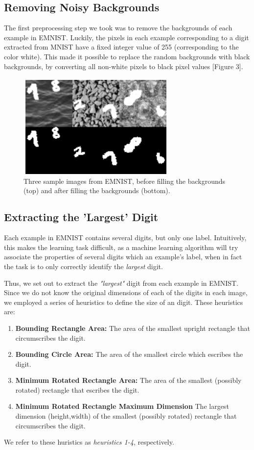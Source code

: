 \documentclass[letterpaper, 10 pt, conference]{ieeeconf}  %
\begin{document}
\subsection{Removing Noisy Backgrounds} 

The first preprocessing step we took was to remove the backgrounds of each example in EMNIST. Luckily, the pixels in each example corresponding to a digit extracted from MNIST have a fixed integer value of 255 (corresponding to the color white). This made it possible to replace the random backgrounds with black backgrounds, by converting all non-white pixels to black pixel values [Figure 3].
\begin{figure}[H]
      \centering
      \includegraphics[scale = 1]{blackout}
		\centering
      \caption{Three sample images from EMNIST, before filling the backgrounds (top) and after filling the backgrounds (bottom).}
      \label{figurelabel}
   \end{figure}

\subsection{Extracting the 'Largest' Digit} 

Each example in EMNIST contains several digits, but only one label. Intuitively, this makes the learning task difficult, as a machine learning algorithm will try associate the properties of several digits which an example's label, when in fact the task is to only correctly identify the \emph{largest} digit. 

Thus, we set out to extract the \emph{"largest"} digit from each example in EMNIST. Since we do not know the original dimensions of each of the digits in each image, we employed a series of heuristics to define the size of an digit. These heuristics are:
\begin{enumerate}
\item \textbf{Bounding Rectangle Area:} The area of the smallest upright rectangle that circumscribes the digit. 
\item \textbf{Bounding Circle Area:} The area of the smallest circle which escribes the digit. 
\item \textbf{Minimum Rotated Rectangle Area:} The area of the smallest (possibly rotated) rectangle that escribes the digit.
\item \textbf{Minimum Rotated Rectangle Maximum Dimension} The largest dimension (height,width) of the smallest (possibly rotated) rectangle that circumscribes the digit. 
\end{enumerate}
We refer to these huristics as \emph{heuristics 1-4}, respectively.
\end{document}
